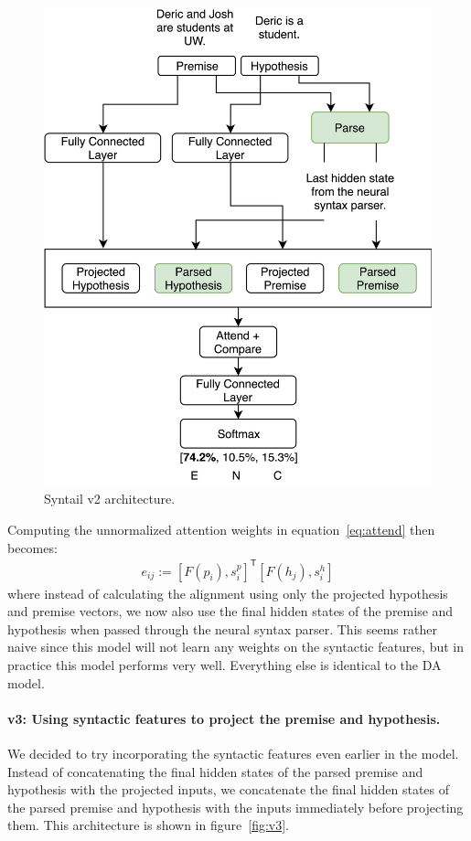 \documentclass[11pt,a4paper]{article}
\begin{document}
\begin{figure}[htb]
  \centering
  \includegraphics[width=\linewidth]{figures/v2.png}
  \caption{Syntail v2 architecture.}
\label{fig:v2}
\end{figure}

Computing the unnormalized attention weights in equation~\ref{eq:attend} then
becomes: \begin{align} e_{ij} := [F(p_i), s^p_i]^\mathsf{T} [F(h_j), s^h_i]
\end{align} where instead of calculating the alignment using only the projected
hypothesis and premise vectors, we now also use the final hidden states of the
premise and hypothesis when passed through the neural syntax parser.  This
seems rather naive since this model will not learn any weights on the syntactic
features, but in practice this model performs very well. Everything else is
identical to the DA model.

\paragraph{v3: Using syntactic features to project the premise and hypothesis.}
We decided to try incorporating the syntactic features even earlier in the
model.  Instead of concatenating the final hidden states of the parsed premise
and hypothesis with the projected inputs, we concatenate the final hidden
states of the parsed premise and hypothesis with the inputs immediately before
projecting them. This architecture is shown in figure~\ref{fig:v3}.
\end{document}
